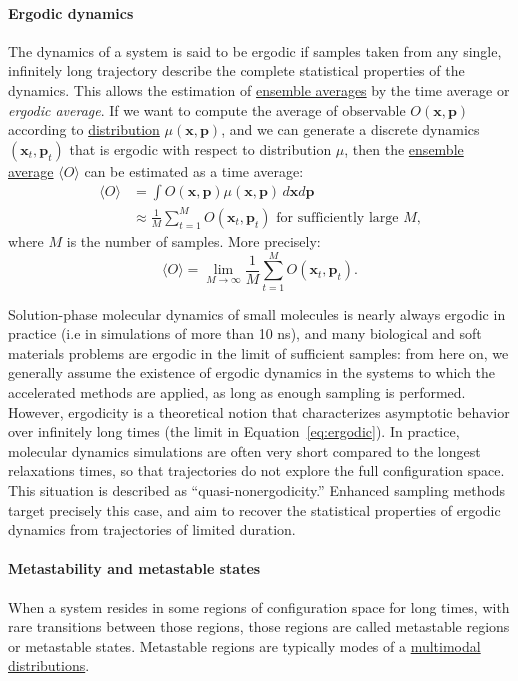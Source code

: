 \documentclass[9pt,review]{livecoms}
\newcommand{\vx}{\mathbf{x}}
\newcommand{\vp}{\mathbf{p}}
\begin{document}
\hypertarget{ref:ergodic} {\paragraph{Ergodic dynamics}}
The dynamics of a system is said to be ergodic if samples taken from any single, infinitely long trajectory describe the complete statistical properties of the dynamics.
This allows the estimation of \hyperlink{ref:ensemble_average} {ensemble averages} by the time average or \textit{ergodic average}.
If we want to compute the average of observable $O(\vx, \vp)$ according to \hyperlink{ref:Distribution} {distribution} $\mu(\vx, \vp)$, and we can generate a discrete dynamics $(\vx_t, \vp_t)$ that is ergodic with respect to distribution $\mu$, then the \hyperlink{ref:ensemble_average} {ensemble average} $\langle O \rangle$ can be estimated as a time average:
\begin{align}
\langle O \rangle &= \int O(\vx, \vp) \mu(\vx, \vp) \, d\vx d\vp
\nonumber \\
&\approx \frac{1}{M} \sum_{t=1}^M O(\vx_t, \vp_t) \text{ for sufficiently large $M$,}
\end{align}
where $M$ is the number of samples. More precisely:
\begin{equation}
   \langle O \rangle = \lim_{M \to \infty} \frac{1}{M} \sum_{t=1}^M O(\vx_t, \vp_t).
    \label{eq:ergodic}
\end{equation}

Solution-phase molecular dynamics of small molecules is nearly always ergodic in practice (i.e in simulations of more than 10 ns), and many biological and soft materials problems are ergodic in the limit of sufficient samples: from here on, we generally assume the existence of ergodic dynamics in the systems to which the accelerated methods are applied, as long as enough sampling is performed.
However, ergodicity is a theoretical notion that characterizes asymptotic behavior over infinitely long times (the limit in Equation~\ref{eq:ergodic}).
In practice, molecular dynamics simulations are often very short compared to the longest relaxations times, so that trajectories do not explore the full configuration space.
This situation is described as ``quasi-nonergodicity.''
Enhanced sampling methods target precisely this case, and aim to recover the statistical properties of ergodic dynamics from trajectories of limited duration.

\hypertarget{ref:metastab} {\paragraph{Metastability and metastable states}}
When a system resides in some regions of configuration space for long times, with rare transitions between those regions, those regions are called metastable regions or metastable states. Metastable regions are typically modes of a \hyperlink{ref:multimodal} {multimodal distributions}.
\end{document}
